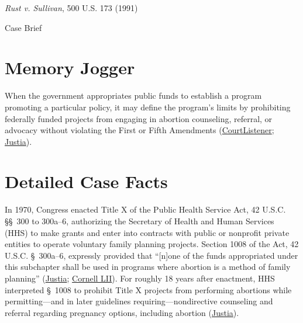 \documentclass[12pt]{article}
\begin{document}
\begin{center}
{\LARGE \textit{Rust v. Sullivan}, 500 U.S. 173 (1991)\par}
\vspace{0.8em}
{\large Case Brief\par}
\end{center}
\vspace{1em}

\section{Memory Jogger}

When the government appropriates public funds to establish a program promoting a particular policy, it may define the program's limits by prohibiting federally funded projects from engaging in abortion counseling, referral, or advocacy without violating the First or Fifth Amendments (\href{https://www.courtlistener.com/opinion/112593/rust-v-sullivan/}{CourtListener}; \href{https://supreme.justia.com/cases/federal/us/500/173/}{Justia}).

\section{Detailed Case Facts}

In 1970, Congress enacted Title X of the Public Health Service Act, 42 U.S.C. \S\S~300 to 300a--6, authorizing the Secretary of Health and Human Services (HHS) to make grants and enter into contracts with public or nonprofit private entities to operate voluntary family planning projects. Section 1008 of the Act, 42 U.S.C. \S~300a--6, expressly provided that ``[n]one of the funds appropriated under this subchapter shall be used in programs where abortion is a method of family planning'' (\href{https://supreme.justia.com/cases/federal/us/500/173/}{Justia}; \href{https://www.law.cornell.edu/supct/html/89-1391.ZS.html}{Cornell LII}). For roughly 18 years after enactment, HHS interpreted \S~1008 to prohibit Title X projects from performing abortions while permitting---and in later guidelines requiring---nondirective counseling and referral regarding pregnancy options, including abortion (\href{https://supreme.justia.com/cases/federal/us/500/173/}{Justia}).
\end{document}
